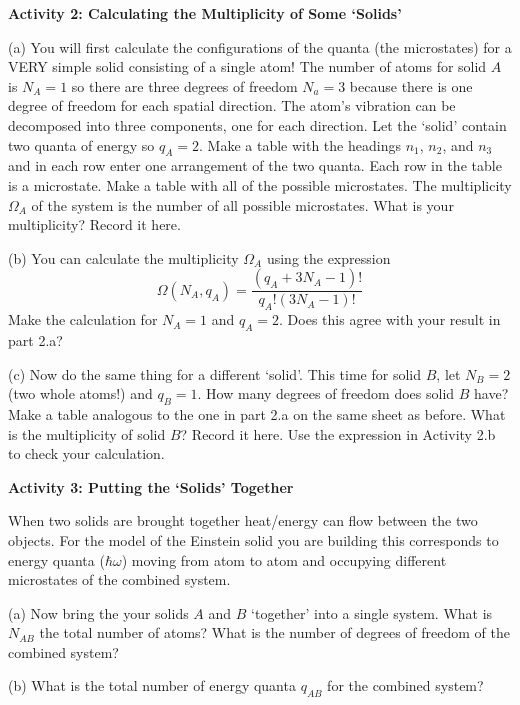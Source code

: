 \textbf{Activity 2: Calculating the Multiplicity of Some `Solids'}

(a) You will first calculate the configurations of 
the quanta (the microstates) for a VERY simple solid consisting of a single
atom!
The number of atoms for solid $A$ is $N_A=1$ so there are three degrees of
freedom $N_a=3$ because there is one degree of freedom for each
spatial direction.
The atom's vibration can be decomposed into three components, one for each direction.
Let the `solid' contain two quanta of energy so $q_A=2$.
Make a table with the headings $n_1$, $n_2$, and $n_3$ 
and in each row enter one
arrangement of the two quanta.
Each row in the table is a microstate.
Make a table with all of the possible microstates.
The multiplicity $\Omega_A$ of the system is the number of all possible
microstates. What is your multiplicity?
Record it here.
\vspace{45mm}

(b) You can calculate the multiplicity $\Omega_A$ using the expression
\begin{equation}
\Omega(N_A,q_A) = \frac{(q_A + 3N_A -1)!}{q_A! (3N_A-1)!}
\end{equation}
Make the calculation for $N_A = 1$ and $q_A = 2$.
Does this agree with your result in part 2.a?
\vspace{15mm}

(c) Now do the same thing for a different `solid'.
This time for solid $B$, let $N_B = 2$ (two whole atoms!) and $q_B = 1$.
How many degrees of freedom does solid $B$ have?
Make a table analogous to the one in part 2.a on the same sheet as before.
What is the multiplicity of solid $B$?
Record it here.
Use the expression in Activity 2.b to check your calculation.
\vspace{45mm}

\textbf{Activity 3: Putting the `Solids' Together}

When two solids are brought together heat/energy can flow between the two objects.
For the model of the Einstein solid you are building this corresponds to 
energy quanta ($\hbar \omega$) moving from atom to atom and occupying different
microstates of the combined system.

(a) Now bring the your solids $A$ and $B$ `together' into a single system.
What is $N_{AB}$ the total number of atoms?
What is the number of degrees of freedom of the combined system?
\vspace{10mm}

(b) What is the total number of energy quanta $q_{AB}$ for the combined system?
\vspace{10mm}

